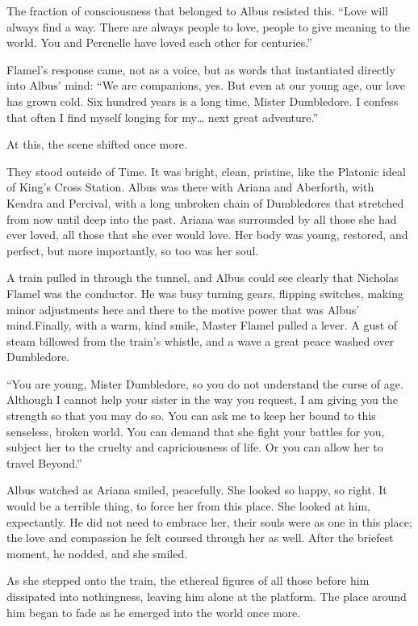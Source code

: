 The fraction of consciousness that belonged to Albus resisted this. “Love will always find a way. There are always people to love, people to give meaning to the world. You and Perenelle have loved each other for centuries.”

Flamel’s response came, not as a voice, but as words that instantiated directly into Albus’ mind: “We are companions, yes. But even at our young age, our love has grown cold. Six hundred years is a long time, Mister Dumbledore. I confess that often I find myself longing for my… next great adventure.”

At this, the scene shifted once more.

They stood outside of Time. It was bright, clean, pristine, like the Platonic ideal of King’s Cross Station. Albus was there with Ariana and Aberforth, with Kendra and Percival, with a long unbroken chain of Dumbledores that stretched from now until deep into the past. Ariana was surrounded by all those she had ever loved, all those that she ever would love. Her body was young, restored, and perfect, but more importantly, so too was her soul.

A train pulled in through the tunnel, and Albus could see clearly that Nicholas Flamel was the conductor. He was busy turning gears, flipping switches, making minor adjustments here and there to the motive power that was Albus’ mind.Finally, with a warm, kind smile, Master Flamel pulled a lever. A gust of steam billowed from the train’s whistle, and a wave a great peace washed over Dumbledore.

“You are young, Mister Dumbledore, so you do not understand the curse of age. Although I cannot help your sister in the way you request, I am giving you the strength so that you may do so. You can ask me to keep her bound to this senseless, broken world. You can demand that she fight your battles for you, subject her to the cruelty and capriciousness of life. Or you can allow her to travel Beyond.”

Albus watched as Ariana smiled, peacefully. She looked so happy, so right. It would be a terrible thing, to force her from this place. She looked at him, expectantly. He did not need to embrace her, their souls were as one in this place; the love and compassion he felt coursed through her as well. After the briefest moment, he nodded, and she smiled.

As she stepped onto the train, the ethereal figures of all those before him dissipated into nothingness, leaving him alone at the platform. The place around him began to fade as he emerged into the world once more.
\simpleline

